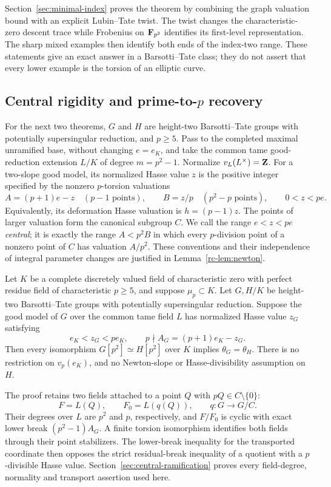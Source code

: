 Section~\ref{sec:minimal-index} proves the theorem by combining the graph valuation bound with an explicit Lubin--Tate twist. The twist changes the characteristic-zero descent trace while Frobenius on $\mathbf F_{p^2}$ identifies its first-level representation. The sharp mixed examples then identify both ends of the index-two range. These statements give an exact answer in a Barsotti--Tate class; they do not assert that every lower example is the torsion of an elliptic curve.

\subsection{Central rigidity and prime-to-$p$ recovery}
For the next two theorems, $G$ and $H$ are height-two Barsotti--Tate groups with potentially supersingular reduction, and $p\ge5$. Pass to the completed maximal unramified base, without changing $e=e_K$, and take the common tame good-reduction extension $L/K$ of degree $m=p^2-1$. Normalize $v_L(L^\times)=\mathbf Z$. For a two-slope good model, its normalized Hasse value $z$ is the positive integer specified by the nonzero $p$-torsion valuations
\[
 A=(p+1)e-z\quad(p-1\text{ points}),\qquad
 B=z/p\quad(p^2-p\text{ points}),\qquad 0<z<pe.
\]
Equivalently, its deformation Hasse valuation is $h=(p-1)z$. The points of larger valuation form the canonical subgroup $C$. We call the range $e<z<pe$ \emph{central}; it is exactly the range $A<p^2B$ in which every $p$-division point of a nonzero point of $C$ has valuation $A/p^2$. These conventions and their independence of integral parameter changes are justified in Lemma~\ref{rc-lem:newton}.

\begin{theorem}\label{thm:central-p2-rigidity}
Let $K$ be a complete discretely valued field of characteristic zero with perfect residue field of characteristic $p\ge5$, and suppose $\mu_p\subset K$. Let $G,H/K$ be height-two Barsotti--Tate groups with potentially supersingular reduction. Suppose the good model of $G$ over the common tame field $L$ has normalized Hasse value $z_G$ satisfying
\[
 e_K<z_G<pe_K,\qquad p\nmid A_G=(p+1)e_K-z_G.
\]
Then every isomorphism $G[p^2]\simeq H[p^2]$ over $K$ implies
$\theta_G=\theta_H$. There is no restriction on $v_p(e_K)$, and no Newton-slope or Hasse-divisibility assumption on $H$.
\end{theorem}

The proof retains two fields attached to a point $Q$ with $pQ\in C\setminus\{0\}$:
\[
 F=L(Q),\qquad F_0=L(q(Q)),\qquad q:G\longrightarrow G/C.
\]
Their degrees over $L$ are $p^2$ and $p$, respectively, and $F/F_0$ is cyclic with exact lower break $(p^2-1)A_G$. A finite torsion isomorphism identifies both fields through their point stabilizers. The lower-break inequality for the transported coordinate then opposes the strict residual-break inequality of a quotient with a $p$-divisible Hasse value. Section~\ref{sec:central-ramification} proves every field-degree, normality and transport assertion used here.

